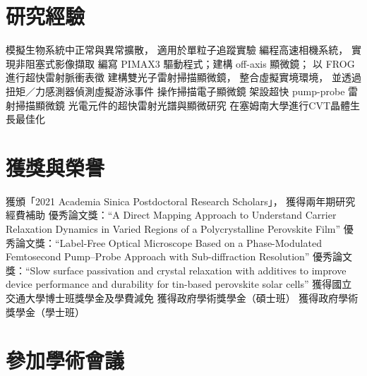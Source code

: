 \documentclass[11pt,a4paper]{moderncv}
\begin{document}
\section{研究經驗}
        {模擬生物系統中正常與異常擴散，
        適用於單粒子追蹤實驗}
        {編程高速相機系統，
        實現非阻塞式影像擷取}
        {編寫 PIMAX3 驅動程式；建構 off-axis 顯微鏡；
        以 FROG 進行超快雷射脈衝表徵}
        {建構雙光子雷射掃描顯微鏡，
        整合虛擬實境環境，
        並透過扭矩／力感測器偵測虛擬游泳事件}
        {操作掃描電子顯微鏡}
        {架設超快 pump-probe 雷射掃描顯微鏡}
        {光電元件的超快雷射光譜與顯微研究}
        {在塞姆南大學進行CVT晶體生長最佳化}
\section{獲獎與榮譽}
        {獲頒「2021 Academia Sinica Postdoctoral Research Scholars」，
        獲得兩年期研究經費補助}
        {優秀論文獎：``A Direct Mapping
        Approach to Understand Carrier Relaxation
        Dynamics in Varied Regions of a
        Polycrystalline Perovskite Film''}
        {優秀論文獎：``Label-Free Optical
        Microscope Based on a Phase-Modulated Femtosecond
        Pump--Probe Approach with Sub-diffraction Resolution''}
        {優秀論文獎：``Slow surface
        passivation and crystal relaxation with additives to
        improve device performance and durability for tin-based
        perovskite solar cells''}
        {獲得國立交通大學博士班獎學金及學費減免}
        {獲得政府學術獎學金（碩士班）}
        {獲得政府學術獎學金（學士班）}
\section{參加學術會議}
\end{document}
